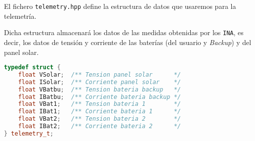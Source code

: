 
El fichero \texttt{telemetry.hpp} define la estructura de datos que usaremos para la telemetría.

Dicha estructura almacenará los datos de las medidas obtenidas por los \texttt{INA}, es decir, los datos de tensión y corriente de las baterías (del usuario y \textit{Backup}) y del panel solar.

\begin{lstlisting}[language=c++,caption={Estructura de datos para la telemetría},captionpos=b]
typedef struct {
    float VSolar;  /** Tension panel solar      */
    float ISolar;  /** Corriente panel solar    */
    float VBatbu;  /** Tension bateria backup   */
    float IBatbu;  /** Corriente bateria backup */
    float VBat1;   /** Tension bateria 1        */
    float IBat1;   /** Corriente bateria 1      */
    float VBat2;   /** Tension bateria 2        */
    float IBat2;   /** Corriente bateria 2      */
} telemetry_t;
\end{lstlisting}